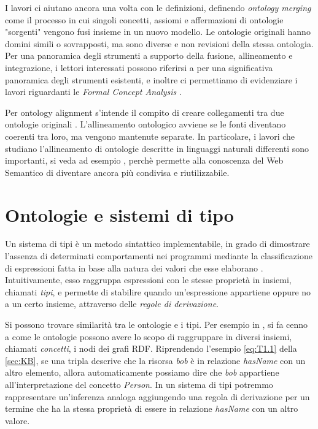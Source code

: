 I lavori \cite{choi2006Mapping, carriero2020OntoReuse} ci aiutano ancora una volta con le definizioni, definendo \textit{ontology merging} come il processo in cui singoli concetti, assiomi e affermazioni di ontologie "sorgenti" vengono fusi insieme in un nuovo modello. Le ontologie originali hanno domini simili o sovrapposti, ma sono diverse e non revisioni della stessa ontologia. Per una panoramica degli strumenti a supporto della fusione, allineamento e integrazione, i lettori interessati possono riferirsi a \cite{choi2006Mapping} per una significativa panoramica degli strumenti esistenti, e inoltre ci permettiamo di evidenziare i lavori riguardanti le \textit{Formal Concept Analysis} \cite{FCA-Merge, Priya2015ASO}. 

Per ontology alignment s'intende il compito di creare collegamenti tra due ontologie originali \cite{choi2006Mapping}. L'allineamento ontologico avviene se le fonti diventano coerenti tra loro, ma vengono mantenute separate. In particolare, i lavori che studiano l'allineamento di ontologie descritte in linguaggi naturali differenti sono importanti, si veda ad esempio \cite{Santos2014StateoftheArtIM}, perchè permette alla conoscenza del Web Semantico di diventare ancora più condivisa e riutilizzabile.

\section{Ontologie e sistemi di tipo}
Un sistema di tipi è un metodo sintattico implementabile, in grado di dimostrare l'assenza di determinati comportamenti nei programmi mediante la classificazione di espressioni fatta in base alla natura dei valori che esse elaborano \cite{pierceTypesBook}. Intuitivamente, esso raggruppa espressioni con le stesse proprietà in insiemi, chiamati \textit{tipi}, e permette di stabilire quando un'espressione appartiene oppure no a un certo insieme, attraverso delle \textsl{regole di derivazione}.

Si possono trovare similarità tra le ontologie e i tipi. Per esempio in \cite{hitzler2021review}, si fa cenno a come le ontologie possono avere lo scopo di raggruppare in diversi insiemi, chiamati \textit{concetti}, i nodi dei grafi RDF. Riprendendo l'esempio \eqref{eq:T1.1} della \autoref{sec:KB}, se una tripla descrive che la risorsa \textsl{bob} è in relazione \textsl{hasName} con un altro elemento, allora automaticamente possiamo dire che \textsl{bob} appartiene all'interpretazione del concetto \textsl{Person}. In un sistema di tipi potremmo rappresentare  un'inferenza analoga aggiungendo una regola di derivazione per un termine che ha la stessa proprietà di essere in relazione \textsl{hasName} con un altro valore.

